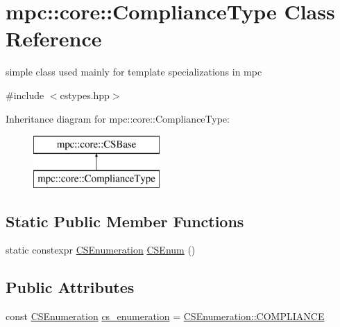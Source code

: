 \hypertarget{structmpc_1_1core_1_1_compliance_type}{}\section{mpc\+:\+:core\+:\+:Compliance\+Type Class Reference}
\label{structmpc_1_1core_1_1_compliance_type}


simple class used mainly for template specializations in mpc  




{\ttfamily \#include $<$cstypes.\+hpp$>$}

Inheritance diagram for mpc\+:\+:core\+:\+:Compliance\+Type\+:\begin{figure}[H]
\begin{center}
\leavevmode
\includegraphics[height=2.000000cm]{structmpc_1_1core_1_1_compliance_type}
\end{center}
\end{figure}
\subsection*{Static Public Member Functions}
\begin{DoxyCompactItemize}
\item 
static constexpr \mbox{\hyperlink{namespacempc_1_1core_ad3e8e7d43bfc9202d954d999f7d5c991}{C\+S\+Enumeration}} \mbox{\hyperlink{structmpc_1_1core_1_1_compliance_type_a4ad878ddbe11a020e9ae2ea400deaf5d}{C\+S\+Enum}} ()
\end{DoxyCompactItemize}
\subsection*{Public Attributes}
\begin{DoxyCompactItemize}
\item 
const \mbox{\hyperlink{namespacempc_1_1core_ad3e8e7d43bfc9202d954d999f7d5c991}{C\+S\+Enumeration}} \mbox{\hyperlink{structmpc_1_1core_1_1_compliance_type_a05e820ab5e2f22d2f66b0d1d91ff3c0b}{cs\+\_\+enumeration}} = \mbox{\hyperlink{namespacempc_1_1core_ad3e8e7d43bfc9202d954d999f7d5c991a185bd2ffef1962ade3c0889c62cee500}{C\+S\+Enumeration\+::\+C\+O\+M\+P\+L\+I\+A\+N\+CE}}
\end{DoxyCompactItemize}


